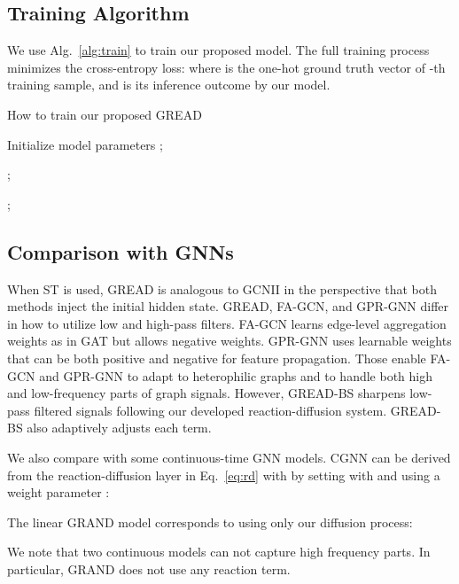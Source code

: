 \documentclass{article}
\theoremstyle{plain}
\theoremstyle{definition}
\theoremstyle{remark}
\begin{document}
\subsection{Training Algorithm}
We use Alg.~\eqref{alg:train} to train our proposed model. The full training process minimizes the cross-entropy loss:
 where  is the one-hot ground truth vector of -th training sample, and  is its inference outcome by our model. 



\begin{algorithm}[t]
\small
\SetAlgoLined
\caption{How to train our proposed GREAD}\label{alg:train}
Initialize model parameters ;

;

\Return ;
\end{algorithm}

\subsection{Comparison with GNNs}

When ST is used, GREAD is analogous to GCNII in the perspective that both methods inject the initial hidden state. GREAD, FA-GCN, and GPR-GNN differ in how to utilize low and high-pass filters. FA-GCN learns edge-level aggregation weights as in GAT but allows negative weights. GPR-GNN uses learnable weights that can be both positive and negative for feature propagation. Those enable FA-GCN and GPR-GNN to adapt to heterophilic graphs and to handle both high and low-frequency parts of graph signals. However, GREAD-BS sharpens low-pass filtered signals following our developed reaction-diffusion system. GREAD-BS also adaptively adjusts each term.


We also compare with some continuous-time GNN models. CGNN can be derived from the reaction-diffusion layer in Eq.~\eqref{eq:rd} with  by setting  with  and using a weight parameter :

The linear GRAND model corresponds to using only our diffusion process:

We note that two continuous models can not capture high frequency parts. In particular, GRAND does not use any reaction term.
\end{document}
